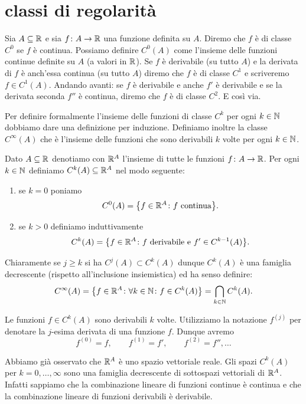 \section{classi di regolarità}

Sia $A\subseteq {\mathbb R}$ e sia $f\colon A\to {\mathbb R}$ una funzione definita su $A$.
Diremo che $f$ è di classe $C^0$ se $f$ è continua. 
Possiamo definire $C^0(A)$ come l'insieme delle funzioni continue definite 
su $A$ (a valori in ${\mathbb R}$).
Se $f$ è derivabile (su tutto $A$) e la derivata di $f$ è anch'essa continua 
(su tutto $A$) diremo che 
$f$ è di classe $C^1$ e scriveremo $f\in C^1(A)$.
Andando avanti: se $f$ è derivabile e anche $f'$ è derivabile e se la derivata 
seconda $f''$ è continua, diremo che $f$ è di classe $C^2$. 
E così via.

Per definire formalmente l'insieme delle funzioni di classe $C^k$ 
per ogni $k\in {\mathbb N}$ dobbiamo dare una definizione per induzione.
Definiamo inoltre la classe $C^{\infty}(A)$ che è l'insieme delle funzioni 
che sono derivabili $k$ volte per ogni $k\in {\mathbb N}$.
%
\begin{definition}
\mymark{**}
Dato $A\subseteq {\mathbb R}$ denotiamo con ${\mathbb R}^A$ l'insieme di tutte le funzioni $f\colon A \to {\mathbb R}$.
Per ogni $k\in {\mathbb N}$ definiamo
$C^k(A) \subseteq {\mathbb R}^A$ nel modo seguente:
%
\begin{enumerate}
\item se $k=0$ poniamo
\[
  C^0(A) = {\left\{ f\in {\mathbb R}^A \colon \text{$f$ continua} \right\}}.
\]
\item
  se $k>0$ definiamo induttivamente
  \[
  C^{k}(A) = {\left\{ f\in {\mathbb R}^A \colon \text{$f$ derivabile e $f'\in C^{k-1}(A)$} \right\}}.
  \]
\end{enumerate}
Chiaramente se $j\ge k$ si ha $C^j(A) \subset C^k(A)$ dunque $C^k(A)$ è una famiglia decrescente (rispetto all'inclusione insiemistica) ed ha senso definire:
%
\[
  C^\infty(A) = {\left\{ f\in {\mathbb R}^A\colon \forall k \in {\mathbb N}\colon f\in C^k(A) \right\}} = \bigcap_{k\in {\mathbb N}} C^k(A).
\]

Le funzioni $f\in C^k(A)$ sono derivabili $k$ volte.
Utilizziamo la notazione $f^{(j)}$%
%
 per denotare la $j$-esima derivata
di una funzione $f$.
Dunque avremo
\[
  f^{(0)} = f, \qquad
  f^{(1)} = f', \qquad
  f^{(2)} = f'', \dots
\]
\end{definition}

Abbiamo già osservato che ${\mathbb R}^A$ è uno spazio vettoriale reale.
Gli spazi $C^k(A)$ per $k=0, \dots, \infty$ sono una famiglia decrescente di sottospazi vettoriali di ${\mathbb R}^A$.
Infatti sappiamo che la combinazione lineare di funzioni continue è continua e che la combinazione lineare di funzioni derivabili è derivabile.

